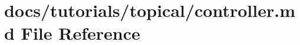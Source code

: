 \hypertarget{controller_8md}{}\section{docs/tutorials/topical/controller.md File Reference}
\label{controller_8md}
